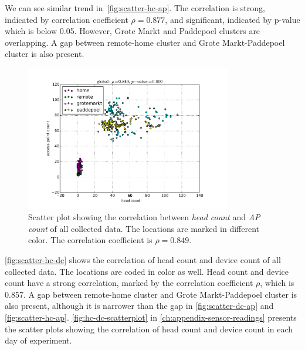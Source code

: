 	We can see similar trend in~\autoref{fig:scatter-hc-ap}. The correlation is strong, indicated by correlation coefficient $\rho = 0.877$, and significant, indicated by p-value which is below 0.05. However, Grote Markt and Paddepoel clusters are overlapping. A gap between remote-home cluster and Grote Markt-Paddepoel cluster is also present.

	\begin{figure}[h]
		\centering
		\includegraphics[width=0.8\textwidth]{./img/result/global-gt-vs-ap}
		\caption[Scatter plot of head and \ac{AP} count.]
		{Scatter plot showing the correlation between \textit{head count} and \textit{\ac{AP} count} of all collected data. The locations are marked in different color. The correlation coefficient is $\rho=0.849$.}
		\label{fig:scatter-hc-ap}
	\end{figure}

	\autoref{fig:scatter-hc-dc} shows the correlation of head count and device count of all collected data. The locations are coded in color as well. Head count and device count have a strong correlation, marked by the correlation coefficient $\rho$, which is 0.857. A gap between remote-home cluster and Grote Markt-Paddepoel cluster is also present, although it is narrower than the gap in \autoref{fig:scatter-dc-ap} and \autoref{fig:scatter-hc-ap}. \autoref{fig:hc-dc-scatterplot} in \autoref{ch:appendix-sensor-readings} presents the scatter plots showing the correlation of head count and device count in each day of experiment.

